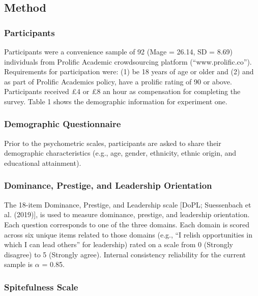 \documentclass[
  english,
  a4paper]{apa7}
\begin{document}
\hypertarget{method}{%
\subsection{Method}\label{method}}

\hypertarget{participants}{%
\subsubsection{Participants}\label{participants}}

Participants were a convenience sample of 92 (Mage = 26.14, SD = 8.69) individuals from Prolific Academic crowdsourcing platform (``www.prolific.co''). Requirements for participation were: (1) be 18 years of age or older and (2) and as part of Prolific Academics policy, have a prolific rating of 90 or above. Participants received £4 or £8 an hour as compensation for completing the survey. Table 1 shows the demographic information for experiment one.

\hypertarget{demographic-questionnaire}{%
\subsubsection{Demographic Questionnaire}\label{demographic-questionnaire}}

Prior to the psychometric scales, participants are asked to share their demographic characteristics (e.g., age, gender, ethnicity, ethnic origin, and educational attainment).

\hypertarget{dominance-prestige-and-leadership-orientation}{%
\subsubsection{Dominance, Prestige, and Leadership Orientation}\label{dominance-prestige-and-leadership-orientation}}

The 18-item Dominance, Prestige, and Leadership scale {[}DoPL; Suessenbach et al. (2019){]}, is used to measure dominance, prestige, and leadership orientation. Each question corresponds to one of the three domains. Each domain is scored across six unique items related to those domains (e.g., ``I relish opportunities in which I can lead others'' for leadership) rated on a scale from 0 (Strongly disagree) to 5 (Strongly agree). Internal consistency reliability for the current sample is \(\alpha\) = 0.85.

\hypertarget{spitefulness-scale}{%
\subsubsection{Spitefulness Scale}\label{spitefulness-scale}}
\end{document}
